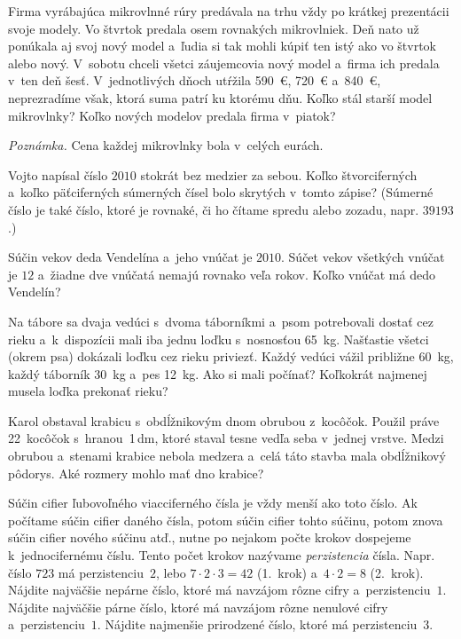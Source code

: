 {%
Firma vyrábajúca mikrovlnné rúry predávala na trhu vždy po krátkej prezentácii svoje modely. Vo
štvrtok predala osem rovnakých mikrovlniek. Deň nato už ponúkala aj svoj nový model a~ľudia si
tak mohli kúpiť ten istý ako vo štvrtok alebo nový. V~sobotu chceli všetci
záujemcovia nový model a~firma ich predala v~ten deň šesť. V~jednotlivých
dňoch utŕžila 590~€, 720~€ a~840~€, neprezradíme však, ktorá suma patrí
ku ktorému dňu.
  \itemitem{$\bullet$} Koľko stál starší model mikrovlnky?
  \itemitem{$\bullet$} Koľko nových modelov predala firma v~piatok?
  
{\it Poznámka.} Cena každej mikrovlnky bola v~celých eurách.
}

{%
Vojto napísal číslo $2010$ stokrát bez medzier za sebou.
Koľko štvorciferných a~koľko päťciferných súmerných čísel bolo skrytých v~tomto
zápise?
(Súmerné číslo je také číslo, ktoré je rovnaké, či ho čítame spredu alebo zozadu, napr. $39193$.)}

{%
Súčin vekov deda Vendelína a~jeho vnúčat je $2010$.
Súčet vekov všetkých vnúčat je $12$ a~žiadne dve vnúčatá nemajú rovnako veľa rokov.
Koľko vnúčat má dedo Vendelín?}

{%
Na tábore sa dvaja vedúci s~dvoma táborníkmi a~psom potrebovali dostať cez
rieku a~k~dispozícii mali iba jednu loďku s~nosnosťou 65~kg. Našťastie všetci
(okrem psa) dokázali loďku cez rieku priviezť. Každý vedúci vážil
približne 60~kg, každý táborník 30~kg a~pes 12~kg.
Ako si mali počínať? Koľkokrát najmenej musela loďka prekonať rieku?}

{%
Karol obstaval krabicu s~obdĺžnikovým dnom obrubou z~kocôčok.
Použil práve 22~kocôčok s~hranou~1\,dm, ktoré staval tesne vedľa seba v~jednej vrstve.
Medzi obrubou a~stenami krabice nebola medzera a~celá táto stavba mala
obdĺžnikový pôdorys.
Aké rozmery mohlo mať dno krabice?}

{%
Súčin cifier ľubovoľného viacciferného čísla je vždy menší ako toto číslo.
Ak počítame súčin cifier daného čísla, potom súčin cifier tohto
súčinu, potom znova súčin cifier nového súčinu atď., nutne po nejakom
počte krokov dospejeme k~jednocifernému číslu.
Tento počet krokov nazývame {\it perzistencia\/} čísla.
Napr. číslo $723$ má perzistenciu~$2$, lebo ${7\cdot2\cdot3}=42$ (1.~krok)
a~$4\cdot2=8$ (2.~krok).
  \itemitem{$\bullet$} Nájdite najväčšie nepárne číslo, ktoré má navzájom rôzne cifry
    a~perzistenciu~$1$.
  \itemitem{$\bullet$} Nájdite najväčšie párne číslo, ktoré má navzájom rôzne nenulové
    cifry a~perzistenciu~$1$.
  \itemitem{$\bullet$} Nájdite najmenšie prirodzené číslo, ktoré má perzistenciu~$3$.
}

